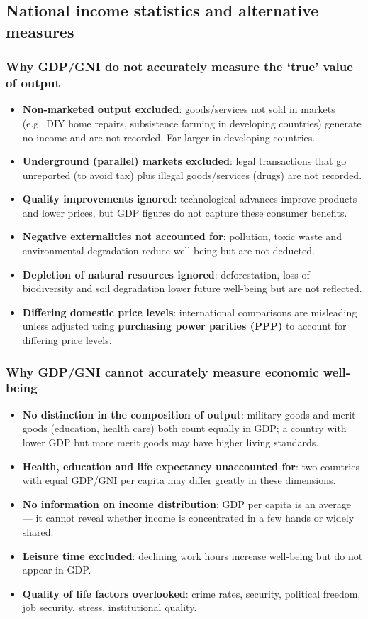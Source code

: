 \documentclass[a4paper,12pt]{article}
\begin{document}
\subsection{National income statistics and alternative measures}
\subsubsection*{Why GDP/GNI do not accurately measure the `true' value of output}
\begin{itemize}
  \item \textbf{Non-marketed output excluded}: goods/services not sold in markets (e.g.\ DIY home repairs, subsistence farming in developing countries) generate no income and are not recorded. Far larger in developing countries.
  \item \textbf{Underground (parallel) markets excluded}: legal transactions that go unreported (to avoid tax) plus illegal goods/services (drugs) are not recorded.
  \item \textbf{Quality improvements ignored}: technological advances improve products and lower prices, but GDP figures do not capture these consumer benefits.
  \item \textbf{Negative externalities not accounted for}: pollution, toxic waste and environmental degradation reduce well-being but are not deducted.
  \item \textbf{Depletion of natural resources ignored}: deforestation, loss of biodiversity and soil degradation lower future well-being but are not reflected.
  \item \textbf{Differing domestic price levels}: international comparisons are misleading unless adjusted using \textbf{purchasing power parities (PPP)} to account for differing price levels.
\end{itemize}
\subsubsection*{Why GDP/GNI cannot accurately measure economic well-being}
\begin{itemize}
  \item \textbf{No distinction in the composition of output}: military goods and merit goods (education, health care) both count equally in GDP; a country with lower GDP but more merit goods may have higher living standards.
  \item \textbf{Health, education and life expectancy unaccounted for}: two countries with equal GDP/GNI per capita may differ greatly in these dimensions.
  \item \textbf{No information on income distribution}: GDP per capita is an average --- it cannot reveal whether income is concentrated in a few hands or widely shared.
  \item \textbf{Leisure time excluded}: declining work hours increase well-being but do not appear in GDP.
  \item \textbf{Quality of life factors overlooked}: crime rates, security, political freedom, job security, stress, institutional quality.
\end{itemize}
\end{document}
